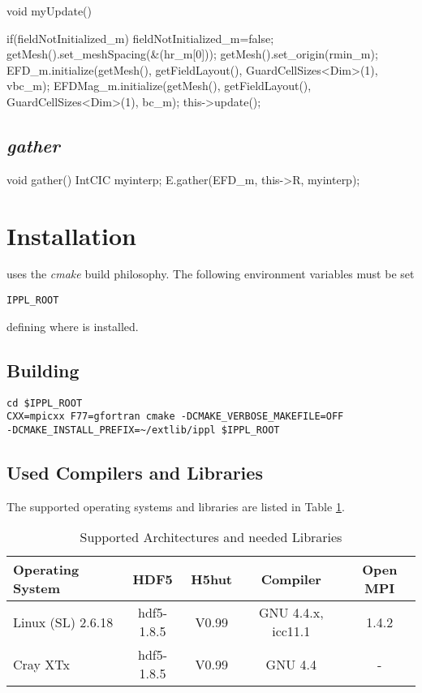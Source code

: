  \begin{code}
void myUpdate() {

    if(fieldNotInitialized_m) {
         fieldNotInitialized_m=false;
         getMesh().set_meshSpacing(&(hr_m[0]));
         getMesh().set_origin(rmin_m);
         EFD_m.initialize(getMesh(), getFieldLayout(), GuardCellSizes<Dim>(1), vbc_m);
         EFDMag_m.initialize(getMesh(), getFieldLayout(), GuardCellSizes<Dim>(1), bc_m);
    }
    this->update();  
}
\end{code}
 
  \subsection{{\em gather}}
 
\begin{code}
void gather() {	
    IntCIC myinterp;
    E.gather(EFD_m, this->R, myinterp);
}
\end{code}
 
\section{Installation}
 \ippl uses the {\em cmake } build philosophy.  The following environment variables must be set
\begin{verbatim}
IPPL_ROOT
\end{verbatim} 
defining where \ippl is installed.

\subsection{Building \ippl}
\begin{verbatim}
cd $IPPL_ROOT
CXX=mpicxx F77=gfortran cmake -DCMAKE_VERBOSE_MAKEFILE=OFF
-DCMAKE_INSTALL_PREFIX=~/extlib/ippl $IPPL_ROOT
\end{verbatim}


\subsection{Used Compilers and Libraries}
The supported operating systems and libraries are listed in Table \ref{tab:archlib}.
\begin{table}[h]
  \caption{Supported Architectures and needed Libraries}
  \label{tab:archlib}
  \begin{center}
    \begin{tabular}{|lcccc|}
      \hline
      Operating System & HDF5  & H5hut & Compiler & Open MPI\\
      \hline
      Linux (SL) 2.6.18 & hdf5-1.8.5 & V0.99 & GNU 4.4.x, icc11.1 & 1.4.2 \\
      Cray XTx  & hdf5-1.8.5 & V0.99 & GNU 4.4 & - \\
      \hline
    \end{tabular}
  \end{center}
\end{table}





